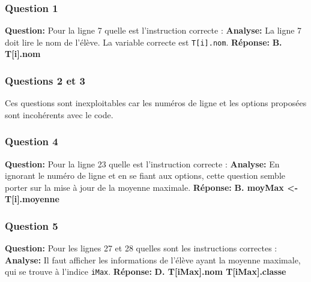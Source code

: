 \documentclass[12pt,a4paper]{article}
\begin{document}
\subsubsection{Question 1}
\textbf{Question:} Pour la ligne 7 quelle est l'instruction correcte :
\textbf{Analyse:} La ligne 7 doit lire le nom de l'élève. La variable correcte est \texttt{T[i].nom}.
\textbf{Réponse:} \textbf{B. T[i].nom}

\subsubsection{Questions 2 et 3}
Ces questions sont inexploitables car les numéros de ligne et les options proposées sont incohérents avec le code.

\subsubsection{Question 4}
\textbf{Question:} Pour la ligne 23 quelle est l'instruction correcte :
\textbf{Analyse:} En ignorant le numéro de ligne et en se fiant aux options, cette question semble porter sur la mise à jour de la moyenne maximale.
\textbf{Réponse:} \textbf{B. moyMax <- T[i].moyenne}

\subsubsection{Question 5}
\textbf{Question:} Pour les lignes 27 et 28 quelles sont les instructions correctes :
\textbf{Analyse:} Il faut afficher les informations de l'élève ayant la moyenne maximale, qui se trouve à l'indice \texttt{iMax}.
\textbf{Réponse:} \textbf{D. T[iMax].nom T[iMax].classe}
\end{document}
